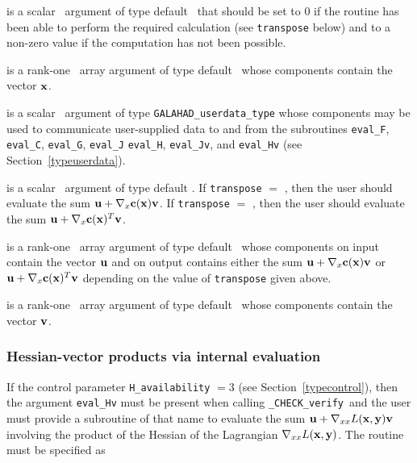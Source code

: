 \documentclass{galahad}
\newcommand{\packagename}{CHECK}
\newcommand{\fullpackagename}{\libraryname\_\packagename}
\newcommand{\solver}{{\tt \fullpackagename\_verify}}
\begin{document}
\begin{description}

 is a scalar \intentout\ argument of type default \integer\
that should be set to 0 if the routine has been able to perform the
required calculation (see {\tt transpose} below) and to a non-zero
value if the computation has not been possible.

 is a rank-one \intentin\ array argument of type default \realdp\
whose components contain the vector ${\mathbf{x}}$.

 is a scalar \intentinout\ argument of type 
{\tt GALAHAD\_userdata\_type} whose components may be used
to communicate user-supplied data to and from the
subroutines {\tt eval\_F}, {\tt eval\_C}, {\tt eval\_G}, {\tt eval\_J}
{\tt eval\_H}, {\tt eval\_Jv}, and {\tt eval\_Hv} 
(see Section~\ref{typeuserdata}).

 is a scalar \intentin\ argument of type default
\logical.  If {\tt transpose} $=$ \false, then the user should evaluate the
sum ${\mathbf{u}} + \nabla_x {\mathbf{c}}({\mathbf{x}}) {\mathbf{v}}$. If {\tt transpose} $=$ \true,
then the user should evaluate the sum ${\mathbf{u}} + \nabla_x {\mathbf{c}}({\mathbf{x}})^T {\mathbf{v}}$.   

\ittf{U} is a rank-one \intentinout\ array argument of type default \realdp\
whose components on input contain the vector ${\mathbf{u}}$ and on output contains
either the sum ${\mathbf{u}} + \nabla_x {\mathbf{c}}({\mathbf{x}}) {\mathbf{v}}$ or ${\mathbf{u}} + \nabla_x {\mathbf{c}}({\mathbf{x}})^T
{\mathbf{v}}$ depending on the value of {\tt transpose} given above.

\ittf{V} is a rank-one \intentin\ array argument of type default \realdp\
whose components contain the vector ${\mathbf{v}}$.

\end{description}


\subsubsection{Hessian-vector products via internal evaluation\label{hvfv}}

If the control parameter {\tt H\_availability} $=3$ (see
Section~\ref{typecontrol}), then the argument {\tt eval\_Hv} must be
present when calling \solver\ and the
user must provide a subroutine of that name to evaluate the
sum ${\mathbf{u}} + \nabla_{xx} L({\mathbf{x}},{\mathbf{y}}) {\mathbf{v}}$ involving the
product of the Hessian of the Lagrangian $\nabla_{xx} L({\mathbf{x}},{\mathbf{y}})$.
The routine must be specified as
\end{document}
